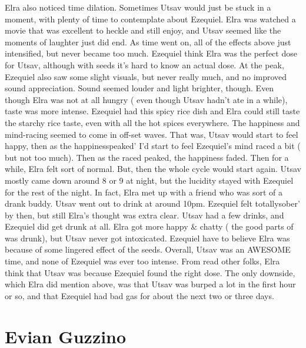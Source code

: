 \documentclass[12pt]{book}
\begin{document}
Elra also noticed time dilation. Sometimes Utsav would just be stuck in a moment, with plenty of time to contemplate about Ezequiel. Elra was watched a movie that was excellent to heckle and still enjoy, and Utsav seemed like the moments of laughter just did end. As time went on, all of the effects above just intensified, but never became too much. Ezequiel think Elra was the perfect dose for Utsav, although with seeds it's hard to know an actual dose. At the peak, Ezequiel also saw some slight visuals, but never really much, and no improved sound appreciation. Sound seemed louder and light brighter, though. Even though Elra was not at all hungry ( even though Utsav hadn't ate in a while), taste was more intense. Ezequiel had this spicy rice dish and Elra could still taste the starchy rice taste, even with all the hot spices everywhere. The happiness and mind-racing seemed to come in off-set waves. That was, Utsav would start to feel happy, then as the happinesspeaked' I'd start to feel Ezequiel's mind raced a bit ( but not too much). Then as the raced peaked, the happiness faded. Then for a while, Elra felt sort of normal. But, then the whole cycle would start again. Utsav mostly came down around 8 or 9 at night, but the lucidity stayed with Ezequiel for the rest of the night. In fact, Elra met up with a friend who was sort of a drank buddy. Utsav went out to drink at around 10pm. Ezequiel felt totallysober' by then, but still Elra's thought was extra clear. Utsav had a few drinks, and Ezequiel did get drunk at all. Elra got more happy \& chatty ( the good parts of was drunk), but Utsav never got intoxicated. Ezequiel have to believe Elra was because of some lingered effect of the seeds. Overall, Utsav was an AWESOME time, and none of Ezequiel was ever too intense. From read other folks, Elra think that Utsav was because Ezequiel found the right dose. The only downside, which Elra did mention above, was that Utsav was burped a lot in the first hour or so, and that Ezequiel had bad gas for about the next two or three days.



\chapter{Evian Guzzino}
\end{document}
